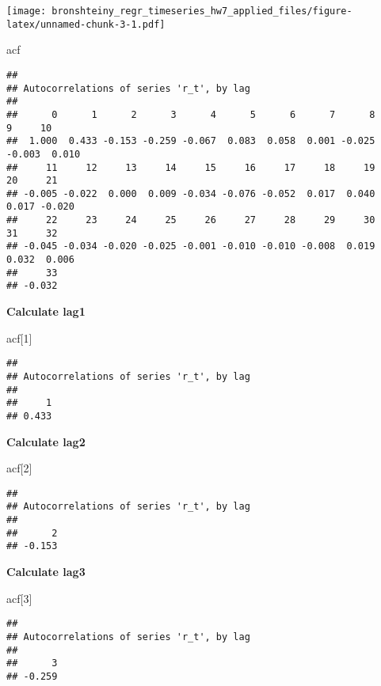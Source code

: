 \documentclass[
]{article}
\newenvironment{Shaded}{\begin{snugshade}}{\end{snugshade}}
\newcommand{\DecValTok}[1]{\textcolor[rgb]{0.00,0.00,0.81}{#1}}
\newcommand{\NormalTok}[1]{#1}
\begin{document}
\texttt{[image: bronshteiny\_regr\_timeseries\_hw7\_applied\_files/figure-latex/unnamed-chunk-3-1.pdf]}

\begin{Shaded}
\begin{Highlighting}[]
\NormalTok{acf}
\end{Highlighting}
\end{Shaded}

\begin{verbatim}
## 
## Autocorrelations of series 'r_t', by lag
## 
##      0      1      2      3      4      5      6      7      8      9     10 
##  1.000  0.433 -0.153 -0.259 -0.067  0.083  0.058  0.001 -0.025 -0.003  0.010 
##     11     12     13     14     15     16     17     18     19     20     21 
## -0.005 -0.022  0.000  0.009 -0.034 -0.076 -0.052  0.017  0.040  0.017 -0.020 
##     22     23     24     25     26     27     28     29     30     31     32 
## -0.045 -0.034 -0.020 -0.025 -0.001 -0.010 -0.010 -0.008  0.019  0.032  0.006 
##     33 
## -0.032
\end{verbatim}

\textbf{Calculate lag1}

\begin{Shaded}
\begin{Highlighting}[]
\NormalTok{acf[}\DecValTok{1}\NormalTok{]}
\end{Highlighting}
\end{Shaded}

\begin{verbatim}
## 
## Autocorrelations of series 'r_t', by lag
## 
##     1 
## 0.433
\end{verbatim}

\textbf{Calculate lag2}

\begin{Shaded}
\begin{Highlighting}[]
\NormalTok{acf[}\DecValTok{2}\NormalTok{]}
\end{Highlighting}
\end{Shaded}

\begin{verbatim}
## 
## Autocorrelations of series 'r_t', by lag
## 
##      2 
## -0.153
\end{verbatim}

\textbf{Calculate lag3}

\begin{Shaded}
\begin{Highlighting}[]
\NormalTok{acf[}\DecValTok{3}\NormalTok{]}
\end{Highlighting}
\end{Shaded}

\begin{verbatim}
## 
## Autocorrelations of series 'r_t', by lag
## 
##      3 
## -0.259
\end{verbatim}
\end{document}
